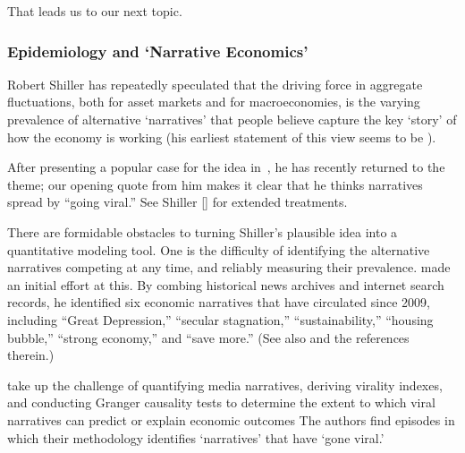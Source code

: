 That leads us to our next topic.


\subsubsection{Epidemiology and `Narrative Economics'}\label{narrativeApproach}

Robert Shiller has repeatedly speculated that the driving force in aggregate fluctuations, both for asset markets and for macroeconomies, is the varying prevalence of alternative `narratives' that people believe capture the key `story' of how the economy is working (his earliest statement of this view seems to be \href{https://www.jstor.org/stable/2117915}{\cite{shiller1995conversation}}).

After presenting a popular case for the idea in~\cite{akerlof2010animal}, he has recently returned to the theme; our opening quote from him makes it clear that he thinks narratives spread by ``going viral.''  See Shiller [\citeyear{shiller2017narrative,shiller_narrative_2019}] for extended treatments.

There are formidable obstacles to turning Shiller's plausible idea into a quantitative modeling tool.  One is the difficulty of identifying the alternative narratives competing at any time, and reliably measuring their prevalence.
\href{https://github.com/iworld1991/EpiExp/blob/master/Literature/shiller2020popular.pdf}{\cite{shiller2020popular}} made an initial effort at this.  By combing historical news archives and internet search records, he identified six economic narratives that have circulated since 2009, including ``Great Depression,'' ``secular stagnation,'' ``sustainability,'' ``housing bubble,'' ``strong economy,'' and ``save more.''  (See also  \cite{ash2021text} and the references therein.)

\cite{larsen2019business} take up the challenge of quantifying media narratives, deriving virality indexes, and conducting Granger causality tests to determine the extent to which viral narratives can predict or explain economic outcomes  The authors find episodes in which their methodology identifies `narratives' that have `gone viral.'  %

